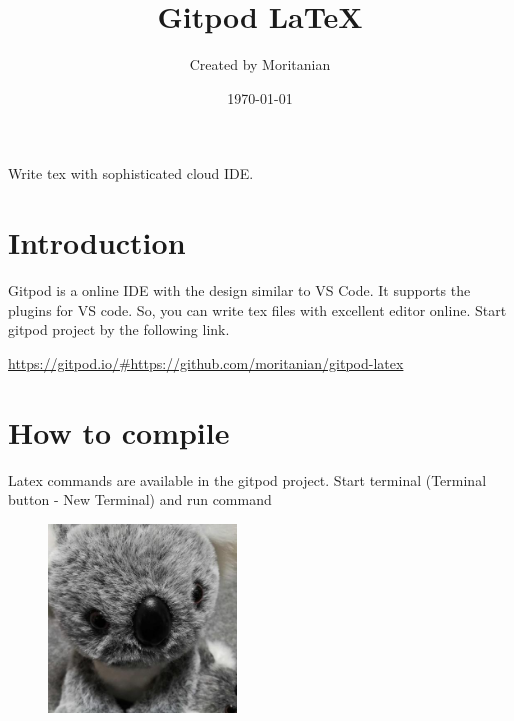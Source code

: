 \documentclass[12pt]{article}
\title{Gitpod \LaTeX}
\author{Created by Moritanian}
\date{\today}
\begin{document}
  \maketitle
  Write tex with sophisticated cloud IDE.

 \section*{Introduction}
Gitpod is a online IDE with the design similar to VS Code.
It supports the plugins for VS code.
So, you can write tex files with excellent editor online.
Start gitpod project by the following link.

\url{https://gitpod.io/#https://github.com/moritanian/gitpod-latex}

\section*{How to compile}
Latex commands are available in the gitpod project.
Start terminal (Terminal button - New Terminal) and run command

\begin{figure}
  \begin{center}
  \includegraphics[height=5cm, keepaspectratio]{mettya_kawaii}
  \end{center}
\end{figure}

  
\end{document}
